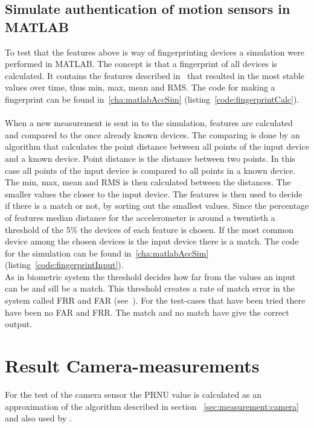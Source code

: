\subsection{Simulate authentication of motion sensors in MATLAB}
To test that the features above is way of fingerprinting devices a simulation were performed in MATLAB. The concept is that a fingerprint of all devices is calculated. It contains the features described in~ that resulted in the most stable values over time, thus min, max, mean and RMS. The code for making a fingerprint can be found in~\ref{cha:matlabAccSim} (listing~\ref{code:fingerprintCalc}).\\
\\
When a new measurement is sent in to the simulation, features are calculated and compared to the once already known devices. The comparing is done by an algorithm that calculates the point distance between all points of the input device and a known device. Point distance is the distance between two points. In this case all points of the input device is compared to all points in a known device. \\
The min, max, mean and RMS is then calculated between the distances. The smaller values the closer to the input device. 
The features is then used to decide if there is a match or not, by sorting out the smallest values. Since the percentage of features median distance for the accelerometer is around a twentieth a threshold of the 5\% the devices of each feature is chosen. If the most common device among the chosen devices is the input device there is a match. The code for the simulation can be found in~\ref{cha:matlabAccSim} (listing~\ref{code:fingerprintInput}).\\
As in biometric system the threshold decides how far from the values an input can be and sill be a match. This threshold creates a rate of match error in the system called FRR and FAR (see~). For the test-cases that have been tried there have been no FAR and FRR. The match and no match have give the correct output.\\

\section{Result Camera-measurements}\label{sec:ResCam}
For the test of the camera sensor the PRNU value is calculated as an approximation of the algorithm described in section ~\ref{sec:measurement:camera} and also used by \cite{sensor:camera:DCIdent}. 

